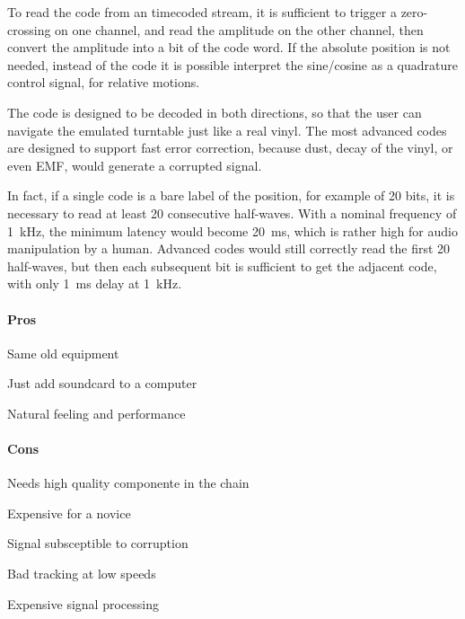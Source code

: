 \documentclass[a4paper,10pt]{article}
\begin{document}
\begin{multicols}{2}
To read the code from an timecoded stream, it is sufficient to trigger a
zero-crossing on one channel, and read the amplitude on the other channel,
then convert the amplitude into a bit of the code word. If the absolute
position is not needed, instead of the code it is possible interpret the
sine/cosine as a quadrature control signal, for relative motions.

The code is designed to be decoded in both directions, so that the user can
navigate the emulated turntable just like a real vinyl. The most advanced
codes are designed to support fast error correction, because dust, decay of
the vinyl, or even EMF, would generate a corrupted signal.

In fact, if a single code is a bare label of the position, for example of 20
bits, it is necessary to read at least 20 consecutive half-waves. With a
nominal frequency of 1~kHz, the minimum latency would become 20~ms, which is
rather high for audio manipulation by a human. Advanced codes would still
correctly read the first 20 half-waves, but then each subsequent bit is
sufficient to get the adjacent code, with only 1~ms delay at 1~kHz.


\paragraph{Pros}
\begin{itemize*}
	\item Same old equipment
	\item Just add soundcard to a computer
	\item Natural feeling and performance
\end{itemize*}


\paragraph{Cons}
\begin{itemize*}
	\item Needs high quality componente in the chain
	\item Expensive for a novice
	\item Signal subsceptible to corruption
	\item Bad tracking at low speeds
	\item Expensive signal processing
\end{itemize*}




\end{multicols}
\end{document}
